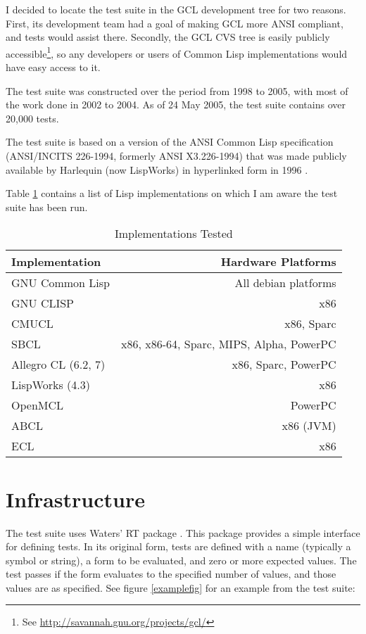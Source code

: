 \documentclass[11pt]{article}
\begin{document}
I decided to locate the test suite in the GCL development tree for two
reasons.  First, its development team had a goal of making GCL more
ANSI compliant, and tests would assist there.  Secondly, the GCL CVS
tree is easily publicly accessible\footnote{See
\url{http://savannah.gnu.org/projects/gcl/}}, so any developers or users of
Common Lisp implementations would have easy access to it.

The test suite was constructed over the period from 1998 to 2005, with
most of the work done in 2002 to 2004.  
As of 24 May 2005, the test suite contains over 20,000 tests.

The test suite is based on a version of the ANSI Common Lisp
specification (ANSI/INCITS 226-1994, formerly ANSI X3.226-1994) that
was made publicly available by Harlequin (now LispWorks) in
hyperlinked form in 1996 \cite{X3J13:94}.

Table \ref{lispimpltab} contains a list of Lisp implementations on
which I am aware the test suite has been run.

\begin{table}
\begin{center}
\begin{tabular}{lr}
Implementation & Hardware Platforms \\ \hline
GNU Common Lisp & All debian platforms \\
GNU CLISP & x86 \\
CMUCL & x86, Sparc \\
SBCL & x86, x86-64, Sparc, MIPS, Alpha, PowerPC \\
Allegro CL (6.2, 7) & x86, Sparc, PowerPC \\
LispWorks (4.3) & x86 \\
OpenMCL & PowerPC \\
ABCL & x86 (JVM) \\
ECL & x86 \\
\end{tabular}
\end{center}
\caption{\label{lispimpltab} Implementations Tested}
\end{table}

\section {Infrastructure}

The test suite uses Waters' RT package \cite{Waters:91a}.  This
package provides a simple interface for defining tests.  In its
original form, tests are defined with a name (typically a symbol
or string), a form to be evaluated, and zero or more expected
values.  The test passes if the form evaluates to the specified
number of values, and those values are as specified.  See figure
\ref{examplefig} for an example from the test suite:
\end{document}
